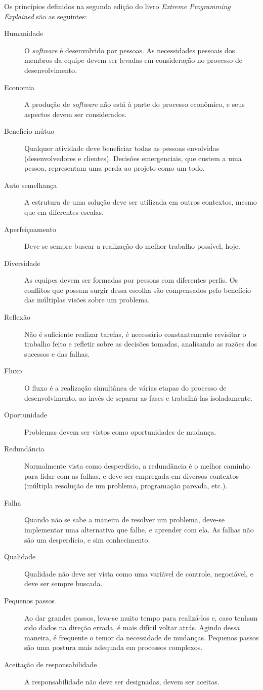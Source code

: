 \documentclass[a4paper,12pt,font=plain,header=plain]{abnt}
\begin{document}
	Os princípios definidos na segunda edição do livro \textit{Extreme Programming Explained}\cite{beck04} são as seguintes:

	\begin{description}
		\item[Humanidade]
		O \textit{software} é desenvolvido por pessoas. As necessidades pessoais dos membros da equipe devem ser levadas em consideração no processo de desenvolvimento.
		\item[Economia]
		A produção de \textit{software} não está à parte do processo econômico, e seus aspectos devem ser considerados.
		\item[Benefício mútuo]
		Qualquer atividade deve beneficiar todas as pessoas envolvidas (desenvolvedores e clientes). Decisões emergenciais, que custem a uma pessoa, representam uma perda ao projeto como um todo.
		\item[Auto semelhança]
		A estrutura de uma solução deve ser utilizada em outros contextos, mesmo que em diferentes escalas.
		\item[Aperfeiçoamento]
		Deve-se sempre buscar a realização do melhor trabalho possível, hoje.
		\item[Diversidade]
		As equipes devem ser formadas por pessoas com diferentes perfis. Os conflitos que possam surgir dessa escolha são compensados pelo benefício das múltiplas visões sobre um problema.
		\item[Reflexão]
		Não é suficiente realizar tarefas, é necessário constantemente revisitar o trabalho feito e refletir sobre as decisões tomadas, analisando as razões dos sucessos e das falhas.
		\item[Fluxo]
		O fluxo é a realização simultânea de várias etapas do processo de desenvolvimento, ao invés de separar as fases e trabalhá-las isoladamente.
		\item[Oportunidade]
		Problemas devem ser vistos como oportunidades de mudança.
		\item[Redundância]
		Normalmente vista como desperdício, a redundância é o melhor caminho para lidar com as falhas, e deve ser empregada em diversos contextos (múltipla resolução de um problema, programação pareada, etc.).
		\item[Falha]
		Quando não se sabe a maneira de resolver um problema, deve-se implementar uma alternativa que falhe, e aprender com ela. As falhas não são um desperdício, e sim conhecimento.
		\item[Qualidade]
		Qualidade não deve ser vista como uma variável de controle, negociável, e deve ser sempre buscada.
		\item[Pequenos passos]
		Ao dar grandes passos, leva-se muito tempo para realizá-los e, caso tenham sido dados na direção errada, é mais difícil voltar atrás. Agindo dessa maneira, é frequente o temor da necessidade de mudanças. Pequenos passos são uma postura mais adequada em processos complexos.
		\item[Aceitação de responsabilidade]
		A responsabilidade não deve ser designadas, devem ser aceitas.
	\end{description}
\end{document}
